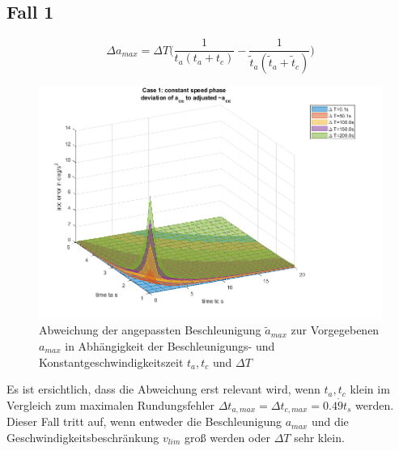 \documentclass[a4paper, 10pt]{scrartcl}
\begin{document}
		\subsection{Fall 1}
			\[\Delta a_{max} = \Delta T \bigg(\frac{1}{t_{a}(t_{a}+t_{c})} -  \frac{1}{\tilde{t}_{a}(\tilde{t}_{a}+\tilde{t}_{c})}\bigg)\]
			\begin{figure}[h!]
				\centering
				\includegraphics[width=0.9\linewidth]{./pics/err_acc.png}
				\caption{Abweichung der angepassten Beschleunigung $ \tilde{a}_{max} $ zur Vorgegebenen $ a_{max} $ in Abhängigkeit der Beschleunigungs- und Konstantgeschwindigkeitszeit $ t_{a}, t_{c} $ und $ \Delta T $}
			\end{figure}
			Es ist ersichtlich, dass die Abweichung erst relevant wird, wenn $ t_{a},t_{c} $ klein im Vergleich zum maximalen Rundungsfehler $ \Delta t_{a,max}=\Delta t_{c,max}=0.4\dot{9}t_{s} $ werden. Dieser Fall tritt auf, wenn entweder die Beschleunigung $ a_{max} $ und die Geschwindigkeitsbeschränkung $ v_{lim} $ groß werden oder $ \Delta T $ sehr klein. 
			
\end{document}
